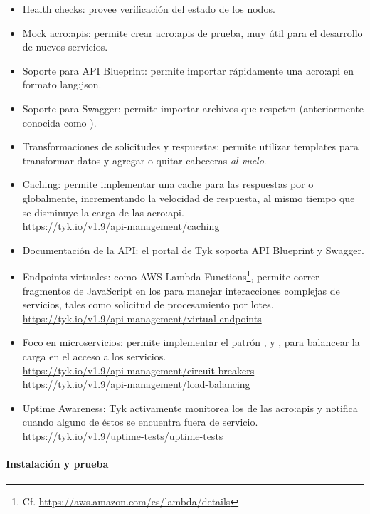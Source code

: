 \begin{itemize}
  \item Health checks: provee verificación del estado de los nodos.
  \item Mock \glspl{acro:api}: permite crear \glspl{acro:api} de prueba, muy útil para el desarrollo de nuevos servicios.
  \item Soporte para API Blueprint: permite importar rápidamente una \gls{acro:api} en formato \gls{lang:json}.
  \item Soporte para Swagger: permite importar archivos que respeten  (anteriormente conocida como ).
  \item Transformaciones de solicitudes y respuestas: permite utilizar templates para transformar datos y agregar o quitar cabeceras \textit{al vuelo}.
  \item Caching: permite implementar una cache para las respuestas por  o globalmente, incrementando la velocidad de respuesta, al mismo tiempo que se disminuye la carga de las \gls{acro:api}. \\
  \url{https://tyk.io/v1.9/api-management/caching}
  \item Documentación de la API: el portal de Tyk soporta API Blueprint y Swagger.
  \item Endpoints virtuales: como AWS Lambda Functions\footnote{Cf. \url{https://aws.amazon.com/es/lambda/details}}, permite correr fragmentos de JavaScript en los  para manejar interacciones complejas de servicios, tales como solicitud de procesamiento por lotes. \\
  \url{https://tyk.io/v1.9/api-management/virtual-endpoints}
  \item Foco en microservicios: permite implementar el patrón ,  y , para balancear la carga en el acceso a los servicios. \\
  \url{https://tyk.io/v1.9/api-management/circuit-breakers} \\
  \url{https://tyk.io/v1.9/api-management/load-balancing}
  \item Uptime Awareness: Tyk activamente monitorea los  de las \glspl{acro:api} y notifica cuando alguno de éstos se encuentra fuera de servicio. \\
  \url{https://tyk.io/v1.9/uptime-tests/uptime-tests}
\end{itemize}

\paragraph{Instalación y prueba}


